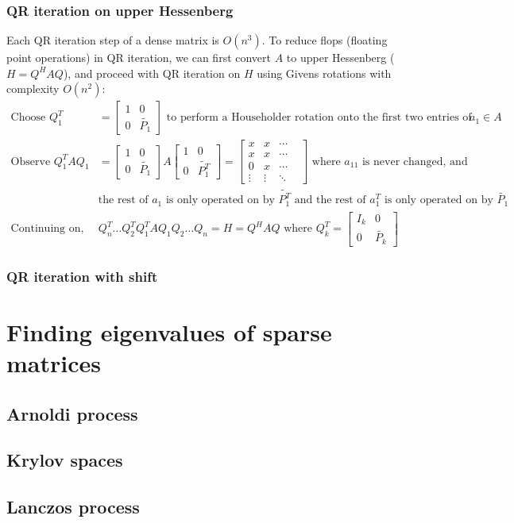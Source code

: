 \documentclass{article}
\begin{document}
\subsubsection{QR iteration on upper Hessenberg}
Each QR iteration step of a dense matrix is $O(n^3)$. To reduce flops (floating point operations) in QR iteration, we can first convert $A$ to upper Hessenberg ($H = Q^HAQ$), and proceed with QR iteration on $H$ using Givens rotations with complexity $O(n^2)$:
\begin{align*}
    \textrm{Choose } Q_1^T &= \begin{bmatrix} 1 & 0 \\ 0 & \tilde{P_1} \end{bmatrix} \textrm{ to perform a Householder rotation onto the first two entries of } a_1 \in A\\
    \textrm{Observe }Q_1^T A Q_1 &= \begin{bmatrix} 1 & 0 \\ 0 & \tilde{P_1} \end{bmatrix} A \begin{bmatrix} 1 & 0 \\ 0 & \tilde{P_1^T} \end{bmatrix} = \begin{bmatrix} x & x & \cdots & \\
        x & x & \cdots \\ 0 & x &\cdots \\ \vdots & \vdots & \ddots \end{bmatrix} \textrm{ where $a_{11}$ is never changed, and}\\
        &\textrm{the rest of $a_1$ is only operated on by $\tilde{P_1^T}$ and the rest of $a_1^T$ is only operated on by $\tilde{P_1}$}\\
    \textrm{Continuing on, } & Q_n^T \dots Q_2^TQ_1^T A Q_1Q_2 \dots Q_n = H = Q^HAQ \textrm{ where } Q_k^T = \begin{bmatrix} I_k & 0 \\ 0 & \tilde{P_k} \end{bmatrix}
\end{align*}

\subsubsection{QR iteration with shift}
\section{Finding eigenvalues of sparse matrices}
\subsection{Arnoldi process}
\subsection{Krylov spaces}
\subsection{Lanczos process}
\end{document}

